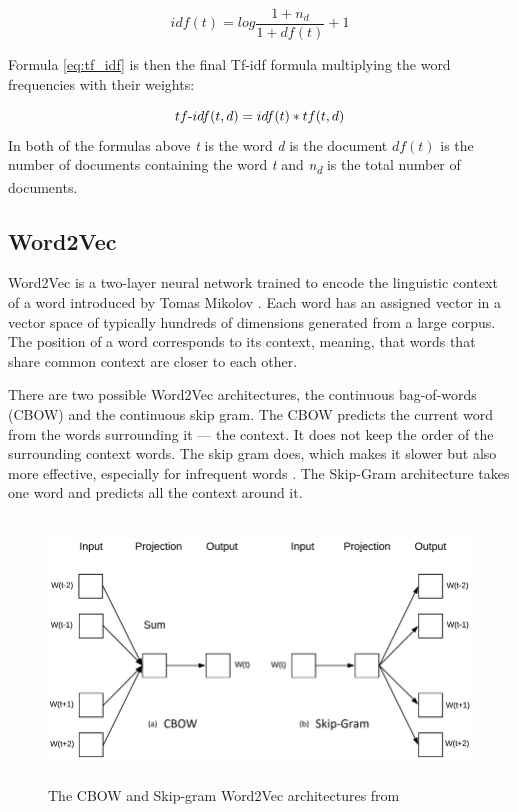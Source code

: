 \begin{equation}\label{eq:idf}
idf(t) = log\frac{1+n_d}{1+df(t)} + 1
\end{equation}

Formula \ref{eq:tf_idf} is then the final Tf-idf formula multiplying the word frequencies with their weights:

\begin{equation}\label{eq:tf_idf}
tf\textnormal{-}idf(t,d) = idf(t)*tf(t,d) 
\end{equation}
In both of the formulas above \textit{t} is the word \textit{d} is the document $ df(t) $ is the number of documents containing the word \textit{t} and \textit{n\textsubscript{d}} is the total number of documents. 

\subsection{Word2Vec}
Word2Vec is a two-layer neural network trained to encode the linguistic context of a word introduced by Tomas Mikolov \cite{DBLP:journals/corr/abs-1301-3781}. Each word has an assigned vector in a vector space of typically hundreds of dimensions generated from a large corpus. The position of a word corresponds to its context, meaning, that words that share common context are closer to each other.

There are two possible Word2Vec architectures, the continuous bag-of-words (CBOW) and the continuous skip gram. The CBOW predicts the current word from the words surrounding it --- the context. It does not keep the order of the surrounding context words. The skip gram does, which makes it slower but also more effective, especially for infrequent words \cite{DBLP:journals/corr/abs-1301-3781}. The Skip-Gram architecture takes one word and predicts all the context around it.
\begin{figure}[h]
    \centering
	\includegraphics[height=70mm]{./img/cbow_skipgram_w2v_architecture.png}
	\caption{The CBOW and Skip-gram Word2Vec architectures from \cite{phdthesis}}
	\label{fig:cbow_skipgram_w2v_architecture}
\end{figure}


